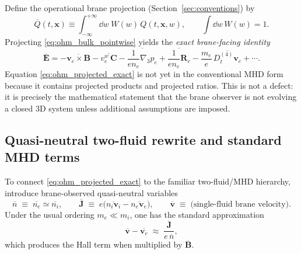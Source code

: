\documentclass[11pt]{article}
\newcommand{\gradthree}{\nabla_3}
\begin{document}
Define the operational brane projection (Section~\ref{sec:conventions}) by
\begin{equation}
\overline{Q}(t,\mathbf{x}) \equiv \int_{-\infty}^{+\infty}\dd w\;W(w)\,Q(t,\mathbf{x},w),
\qquad \int\dd w\,W(w)=1.
\label{eq:ohm_proj_def}
\end{equation}
Projecting \eqref{eq:ohm_bulk_pointwise} yields the \emph{exact brane-facing identity}
\begin{equation}
\boxed{
\overline{\mathbf{E}}
=
-\overline{\mathbf{v}_e\times\mathbf{B}}
-\overline{v_e^w\,\mathbf{C}}
-\overline{\frac{1}{e n_e}\gradthree p_e}
+\overline{\frac{1}{e n_e}\mathbf{R}_e}
-\frac{m_e}{e}\,\overline{D_t^{(4)}\mathbf{v}_e}
+\cdots.
}
\label{eq:ohm_projected_exact}
\end{equation}
Equation \eqref{eq:ohm_projected_exact} is not yet in the conventional MHD form because it
contains projected products and projected ratios. This is not a defect: it is precisely the
mathematical statement that the brane observer is not evolving a closed \(3\)D system unless
additional assumptions are imposed.

\subsection{Quasi-neutral two-fluid rewrite and standard MHD terms}
\label{subsec:ohm_twofluid_rewrite_4d}

To connect \eqref{eq:ohm_projected_exact} to the familiar two-fluid/MHD hierarchy, introduce
brane-observed quasi-neutral variables
\begin{equation}
\overline{n}\;\equiv\;\overline{n_e}\simeq \overline{n_i},
\qquad
\overline{\mathbf{J}}\;\equiv\;e\Big(\overline{n_i\mathbf{v}_i}-\overline{n_e\mathbf{v}_e}\Big),
\qquad
\overline{\mathbf{v}}\;\equiv\;\text{(single-fluid brane velocity)}.
\label{eq:ohm_twofluid_vars}
\end{equation}
Under the usual ordering \(m_e\ll m_i\), one has the standard approximation
\begin{equation}
\overline{\mathbf{v}}-\overline{\mathbf{v}_e}
\;\approx\;
\frac{\overline{\mathbf{J}}}{e\,\overline{n}},
\label{eq:v_minus_ve_hall}
\end{equation}
which produces the Hall term when multiplied by \(\overline{\mathbf{B}}\).
\end{document}
